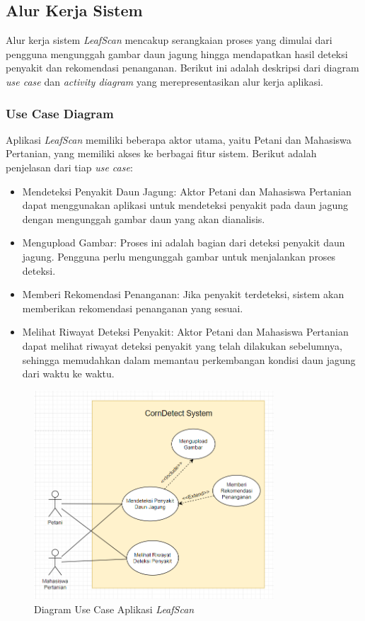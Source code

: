 \documentclass[journal,article,submit,pdftex,moreauthors]{Definitions/mdpi}
\begin{document}
\subsection{Alur Kerja Sistem}

Alur kerja sistem \textit{LeafScan} mencakup serangkaian proses yang dimulai dari pengguna mengunggah gambar daun jagung hingga mendapatkan hasil deteksi penyakit dan rekomendasi penanganan. Berikut ini adalah deskripsi dari diagram \textit{use case} dan \textit{activity diagram} yang merepresentasikan alur kerja aplikasi.

\subsubsection{Use Case Diagram}
Aplikasi \textit{LeafScan} memiliki beberapa aktor utama, yaitu Petani dan Mahasiswa Pertanian, yang memiliki akses ke berbagai fitur sistem. Berikut adalah penjelasan dari tiap \textit{use case}:

\begin{itemize}
    \item Mendeteksi Penyakit Daun Jagung: Aktor Petani dan Mahasiswa Pertanian dapat menggunakan aplikasi untuk mendeteksi penyakit pada daun jagung dengan mengunggah gambar daun yang akan dianalisis.
    \item Mengupload Gambar: Proses ini adalah bagian dari deteksi penyakit daun jagung. Pengguna perlu mengunggah gambar untuk menjalankan proses deteksi.
    \item Memberi Rekomendasi Penanganan: Jika penyakit terdeteksi, sistem akan memberikan rekomendasi penanganan yang sesuai.
    \item Melihat Riwayat Deteksi Penyakit: Aktor Petani dan Mahasiswa Pertanian dapat melihat riwayat deteksi penyakit yang telah dilakukan sebelumnya, sehingga memudahkan dalam memantau perkembangan kondisi daun jagung dari waktu ke waktu.
\end{itemize}

\begin{figure}[H]
    \centering
    \includegraphics[width=0.8\textwidth]{Images/use_case.png}
    \caption{\centering Diagram Use Case Aplikasi \textit{LeafScan}}
    \label{fig:use-case}
\end{figure}
\end{document}
